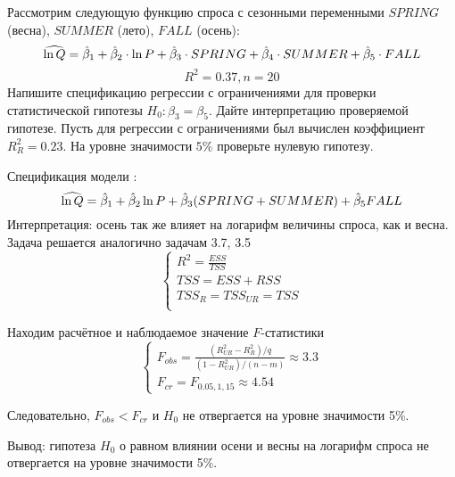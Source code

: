 \begin{problem} %
 Рассмотрим следующую функцию спроса с сезонными переменными $SPRING$ (весна), $SUMMER$ (лето), $FALL$ (осень):
\[
\widehat{\ln Q}=\hat{\beta}_1+\hat{\beta}_2\cdot{\ln P}+\hat{\beta}_3\cdot{SPRING}+\hat{\beta}_4\cdot{SUMMER}+\hat{\beta}_5\cdot{FALL}
\]
\[
R^2=0.37,n=20
\]
Напишите спецификацию регрессии с ограничениями для проверки статистической гипотезы $H_0: \beta_3 = \beta_5$. Дайте интерпретацию проверяемой гипотезе. Пусть для регрессии с ограничениями был вычислен коэффициент $R_{R}^2=0.23$. На уровне значимости $5\%$ проверьте нулевую гипотезу.


\begin{sol}
Спецификация модели :
\[
\widehat{\ln{Q}} = \hat{\beta}_1+\hat{\beta}_2 \ln{P}+\hat{\beta}_3(SPRING+SUMMER)+\hat{\beta}_5 FALL
\]
Интерпретация: осень так же влияет на логарифм величины спроса, как и весна. Задача решается аналогично задачам 3.7, 3.5
\[
\begin{cases}
R^2=\frac{ESS}{TSS}\\
TSS=ESS+RSS\\
TSS_R=TSS_{UR}=TSS\\
\end{cases}
\]

Находим расчётное и наблюдаемое значение $F$-статистики
\[
\begin{cases}
F_{obs}=\frac{(R_{UR}^2-R_{R}^2)/q}{(1-R^2_{UR})/(n-m)}\approx3.3\\
F_{cr}= F_{0.05,1,15}\approx 4.54
\end{cases}
\]

Следовательно, $F_{obs}<F_{cr}$ и $H_0$ не отвергается на уровне значимости 5\%.

Вывод: гипотеза $H_0$ о равном влиянии осени и весны на логарифм спроса не отвергается на уровне значимости 5\%.
\end{sol}
\end{problem}



